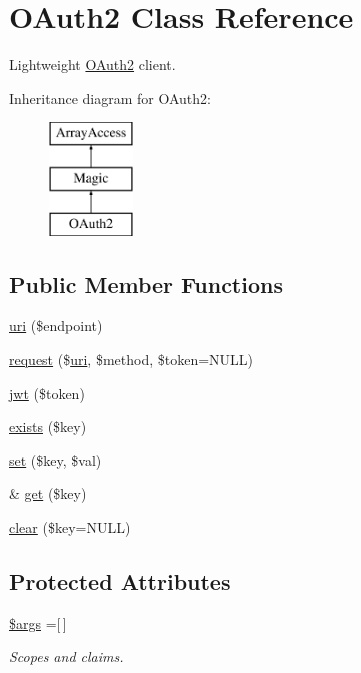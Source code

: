 \hypertarget{class_web_1_1_o_auth2}{}\section{O\+Auth2 Class Reference}
\label{class_web_1_1_o_auth2}


Lightweight \hyperlink{class_web_1_1_o_auth2}{O\+Auth2} client.  


Inheritance diagram for O\+Auth2\+:\begin{figure}[H]
\begin{center}
\leavevmode
\includegraphics[height=3.000000cm]{class_web_1_1_o_auth2}
\end{center}
\end{figure}
\subsection*{Public Member Functions}
\begin{DoxyCompactItemize}
\item 
\hyperlink{class_web_1_1_o_auth2_a52f2721541169726269393c6eaaf8f53}{uri} (\$endpoint)
\item 
\hyperlink{class_web_1_1_o_auth2_ad75f56dfe168d5939f0c5b161d95d351}{request} (\$\hyperlink{class_web_1_1_o_auth2_a52f2721541169726269393c6eaaf8f53}{uri}, \$method, \$token=N\+U\+LL)
\item 
\hyperlink{class_web_1_1_o_auth2_a0520d136dfbea7d3360681b460d23a3c}{jwt} (\$token)
\item 
\hyperlink{class_web_1_1_o_auth2_ace1ae5be37bf26c172cc7ea4e1a65e26}{exists} (\$key)
\item 
\hyperlink{class_web_1_1_o_auth2_ac8d8012023e560c81f55a629022cb65a}{set} (\$key, \$val)
\item 
\& \hyperlink{class_web_1_1_o_auth2_ac3695923790b06917410e205068b8376}{get} (\$key)
\item 
\hyperlink{class_web_1_1_o_auth2_a3afe9e27ee9d208e19b23b9e5ba2689a}{clear} (\$key=N\+U\+LL)
\end{DoxyCompactItemize}
\subsection*{Protected Attributes}
\begin{DoxyCompactItemize}
\item 
\hypertarget{class_web_1_1_o_auth2_a67e94494731d99ed23b123e95175bc10}{}\label{class_web_1_1_o_auth2_a67e94494731d99ed23b123e95175bc10} 
\hyperlink{class_web_1_1_o_auth2_a67e94494731d99ed23b123e95175bc10}{\$args} =\mbox{[}$\,$\mbox{]}
\begin{DoxyCompactList}\small\item\em Scopes and claims. \end{DoxyCompactList}\end{DoxyCompactItemize}


